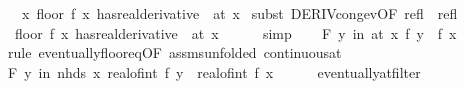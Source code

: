 \begin{isabellebody}
\ \ \ {\isachardoublequoteopen}{\isacharparenleft}{\kern0pt}{\isacharparenleft}{\kern0pt}{\isasymlambda}x{\isachardot}{\kern0pt}\ floor\ {\isacharparenleft}{\kern0pt}f\ x{\isacharparenright}{\kern0pt}{\isacharparenright}{\kern0pt}\ has{\isacharunderscore}{\kern0pt}real{\isacharunderscore}{\kern0pt}derivative\ {}{\isacharparenright}{\kern0pt}\ {\isacharparenleft}{\kern0pt}at\ x{\isacharparenright}{\kern0pt}{\isachardoublequoteclose}\isanewline
%
\isadelimproof
%
\endisadelimproof
%
\isatagproof
{}\isamarkupfalse%
\ {\isacharparenleft}{\kern0pt}subst\ DERIV{\isacharunderscore}{\kern0pt}cong{\isacharunderscore}{\kern0pt}ev{\isacharbrackleft}{\kern0pt}OF\ refl\ {\isacharunderscore}{\kern0pt}\ refl{\isacharbrackright}{\kern0pt}{\isacharparenright}{\kern0pt}\isanewline
\ \ \isamarkupfalse%
\ {\isachardoublequoteopen}{\isacharparenleft}{\kern0pt}{\isacharparenleft}{\kern0pt}{\isasymlambda}{\isacharunderscore}{\kern0pt}{\isachardot}{\kern0pt}\ floor\ {\isacharparenleft}{\kern0pt}f\ x{\isacharparenright}{\kern0pt}{\isacharparenright}{\kern0pt}\ has{\isacharunderscore}{\kern0pt}real{\isacharunderscore}{\kern0pt}derivative\ {}{\isacharparenright}{\kern0pt}\ {\isacharparenleft}{\kern0pt}at\ x{\isacharparenright}{\kern0pt}{\isachardoublequoteclose}\isanewline
\ \ \ \ \isamarkupfalse%
\ simp\isanewline
\ \ \isamarkupfalse%
\ {\isachardoublequoteopen}{\isasymforall}\isactrlsub F\ y\ in\ at\ x{\isachardot}{\kern0pt}\ {\isasymlfloor}f\ y{\isasymrfloor}\ {\isacharequal}{\kern0pt}\ {\isasymlfloor}f\ x{\isasymrfloor}{\isachardoublequoteclose}\isanewline
\ \ \ \ \isamarkupfalse%
\ {\isacharparenleft}{\kern0pt}rule\ eventually{\isacharunderscore}{\kern0pt}floor{\isacharunderscore}{\kern0pt}eq{\isacharbrackleft}{\kern0pt}OF\ assms{\isacharbrackleft}{\kern0pt}unfolded\ continuous{\isacharunderscore}{\kern0pt}at{\isacharbrackright}{\kern0pt}{\isacharbrackright}{\kern0pt}{\isacharparenright}{\kern0pt}\isanewline
\ \ \isamarkupfalse%
\ \isamarkupfalse%
\ {\isachardoublequoteopen}{\isasymforall}\isactrlsub F\ y\ in\ nhds\ x{\isachardot}{\kern0pt}\ real{\isacharunderscore}{\kern0pt}of{\isacharunderscore}{\kern0pt}int\ {\isasymlfloor}f\ y{\isasymrfloor}\ {\isacharequal}{\kern0pt}\ real{\isacharunderscore}{\kern0pt}of{\isacharunderscore}{\kern0pt}int\ {\isasymlfloor}f\ x{\isasymrfloor}{\isachardoublequoteclose}\isanewline
\ \ \ \ \isamarkupfalse%
\ eventually{\isacharunderscore}{\kern0pt}at{\isacharunderscore}{\kern0pt}filter\isanewline

\end{isabellebody}
